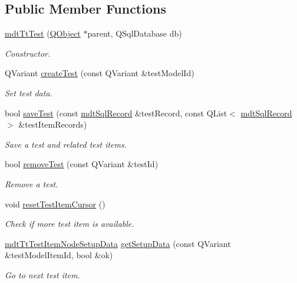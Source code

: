 \subsection*{Public Member Functions}
\begin{DoxyCompactItemize}
\item 
\hyperlink{classmdt_tt_test_a607eadd86d30aa34dbd9daaf4c03725c}{mdt\-Tt\-Test} (\hyperlink{class_q_object}{Q\-Object} $\ast$parent, Q\-Sql\-Database db)
\begin{DoxyCompactList}\small\item\em Constructor. \end{DoxyCompactList}\item 
Q\-Variant \hyperlink{classmdt_tt_test_a07249bc1f02d16974af0b171d7e391de}{create\-Test} (const Q\-Variant \&test\-Model\-Id)
\begin{DoxyCompactList}\small\item\em Set test data. \end{DoxyCompactList}\item 
bool \hyperlink{classmdt_tt_test_a816f7197031e96148996333b9c625702}{save\-Test} (const \hyperlink{classmdt_sql_record}{mdt\-Sql\-Record} \&test\-Record, const Q\-List$<$ \hyperlink{classmdt_sql_record}{mdt\-Sql\-Record} $>$ \&test\-Item\-Records)
\begin{DoxyCompactList}\small\item\em Save a test and related test items. \end{DoxyCompactList}\item 
bool \hyperlink{classmdt_tt_test_a8dc26af849b8e928385e5f25697ebb47}{remove\-Test} (const Q\-Variant \&test\-Id)
\begin{DoxyCompactList}\small\item\em Remove a test. \end{DoxyCompactList}\item 
void \hyperlink{classmdt_tt_test_ae8cafeb9cebf1c11ca136a94ba75020c}{reset\-Test\-Item\-Cursor} ()
\begin{DoxyCompactList}\small\item\em Check if more test item is available. \end{DoxyCompactList}\item 
\hyperlink{classmdt_tt_test_item_node_setup_data}{mdt\-Tt\-Test\-Item\-Node\-Setup\-Data} \hyperlink{classmdt_tt_test_a71e868fa2c182b33982276e52f9c4d23}{get\-Setup\-Data} (const Q\-Variant \&test\-Model\-Item\-Id, bool \&ok)
\begin{DoxyCompactList}\small\item\em Go to next test item. \end{DoxyCompactList}\end{DoxyCompactItemize}
